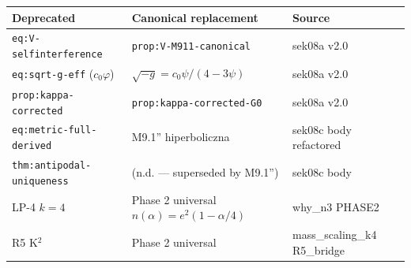 \begin{tabular}{@{}lll@{}}
\toprule
\textbf{Deprecated} & \textbf{Canonical replacement} & \textbf{Source} \\
\midrule
\texttt{eq:V-selfinterference} & \texttt{prop:V-M911-canonical} & sek08a v2.0 \\
\texttt{eq:sqrt-g-eff} ($c_0\varphi$) & $\sqrt{-g}=c_0\psi/(4-3\psi)$ & sek08a v2.0 \\
\texttt{prop:kappa-corrected} & \texttt{prop:kappa-corrected-G0} & sek08a v2.0 \\
\texttt{eq:metric-full-derived} & M9.1'' hiperboliczna & sek08c body refactored \\
\texttt{thm:antipodal-uniqueness} & (n.d. — superseded by M9.1'') & sek08c body \\
LP-4 $k=4$ & Phase 2 universal $n(\alpha)=e^2(1-\alpha/4)$ & why\_n3 PHASE2 \\
R5 K$^2$ & Phase 2 universal & mass\_scaling\_k4 R5\_bridge \\
\bottomrule
\end{tabular}

